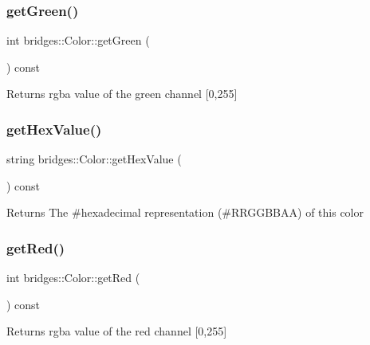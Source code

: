\subsubsection{\texorpdfstring{get\+Green()}{getGreen()}}
{\footnotesize\ttfamily int bridges\+::\+Color\+::get\+Green (\begin{DoxyParamCaption}{ }\end{DoxyParamCaption}) const\hspace{0.3cm}{\ttfamily [inline]}}

\begin{DoxyReturn}{Returns}
rgba value of the green channel \mbox{[}0,255\mbox{]} 
\end{DoxyReturn}
\mbox{\label{classbridges_1_1_color_a051fa9e828ce7025093c65c46358a8cf}} 
\subsubsection{\texorpdfstring{get\+Hex\+Value()}{getHexValue()}}
{\footnotesize\ttfamily string bridges\+::\+Color\+::get\+Hex\+Value (\begin{DoxyParamCaption}{ }\end{DoxyParamCaption}) const\hspace{0.3cm}{\ttfamily [inline]}}

\begin{DoxyReturn}{Returns}
The \#hexadecimal representation (\#\+R\+R\+G\+G\+B\+B\+AA) of this color 
\end{DoxyReturn}
\mbox{\label{classbridges_1_1_color_a4c81e33854a6fdba9a3030e97ec8609e}} 
\subsubsection{\texorpdfstring{get\+Red()}{getRed()}}
{\footnotesize\ttfamily int bridges\+::\+Color\+::get\+Red (\begin{DoxyParamCaption}{ }\end{DoxyParamCaption}) const\hspace{0.3cm}{\ttfamily [inline]}}

\begin{DoxyReturn}{Returns}
rgba value of the red channel \mbox{[}0,255\mbox{]} 
\end{DoxyReturn}
\mbox{\label{classbridges_1_1_color_ae55f3077cb3bd93386dc11eaeecf823c}} 
